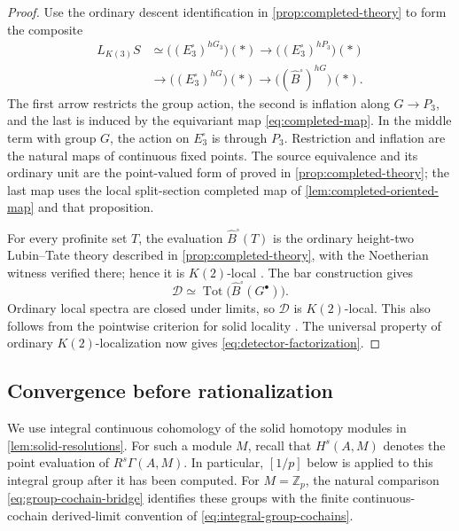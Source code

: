 \documentclass[11pt]{article}
\numberwithin{equation}{section}
\theoremstyle{definition}
\theoremstyle{remark}
\begin{document}
\begin{proof}
Use the ordinary descent identification in
\cref{prop:completed-theory} to form the composite
\begin{equation}\label{eq:detector-construction}
\begin{split}
 L_{K(3)}S
 &\simeq\bigl((E_3^{\square})^{hG_3}\bigr)(*)
 \longrightarrow\bigl((E_3^{\square})^{hP_3}\bigr)(*)\\
 &\longrightarrow\bigl((E_3^{\square})^{hG}\bigr)(*)
 \longrightarrow\bigl((\widehat B^{\square})^{hG}\bigr)(*).
\end{split}
\end{equation}
The first arrow restricts the group action, the second is inflation along
$G\to P_3$, and the last is induced by the equivariant map
\eqref{eq:completed-map}.  In the middle term with group $G$, the action on
$E_3^{\square}$ is through $P_3$. Restriction and inflation are the
natural maps of continuous fixed points. The source equivalence and its ordinary unit are the point-valued
form of \cite[Proposition~4.6.9]{BMR2026} proved in
\cref{prop:completed-theory}; the last map uses the local split-section
completed map of \cref{lem:completed-oriented-map} and that proposition.

For every profinite set $T$, the evaluation
$\widehat B^{\square}(T)$ is the ordinary height-two Lubin--Tate theory
described in \cref{prop:completed-theory}, with the Noetherian witness
verified there; hence it is $K(2)$-local
\cite[Proposition~4.4.2]{BMR2026}.
The bar construction gives
\[
 \mathcal D\simeq\operatorname{Tot}\bigl(\widehat B^{\square}(G^{\bullet})\bigr).
\]
Ordinary local spectra are closed under limits, so $\mathcal D$ is
$K(2)$-local.  This also follows from the
pointwise criterion for solid locality
\cite[Definition~4.5.7 and the following paragraph]{BMR2026}.
The universal property of ordinary $K(2)$-localization now gives
\eqref{eq:detector-factorization}.
\end{proof}

\subsection{Convergence before rationalization}

We use integral continuous cohomology of the solid homotopy modules in
\cref{lem:solid-resolutions}.  For such a module $M$, recall that
$H^s(A,M)$ denotes the point evaluation of $R^s\Gamma(A,M)$.
In particular, $[1/p]$ below is applied to this integral group after it
has been computed.  For $M=\mathbb Z_p$, the natural comparison
\eqref{eq:group-cochain-bridge} identifies these groups with the
finite continuous-cochain derived-limit convention of
\eqref{eq:integral-group-cochains}.
\end{document}

